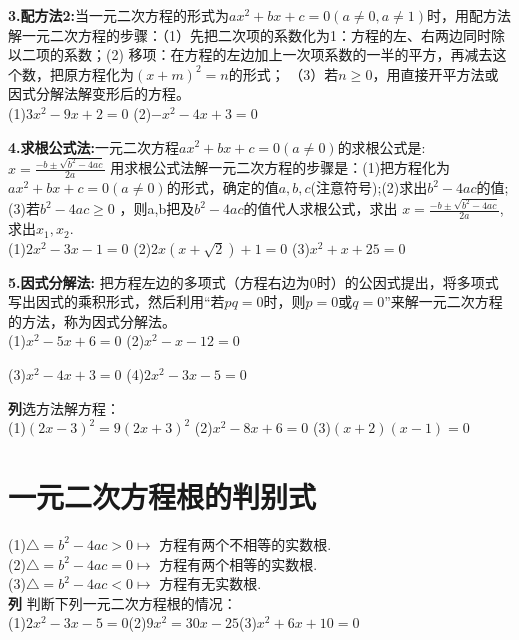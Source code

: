 \textbf{3.配方法2:}当一元二次方程的形式为$ax^2+bx+c=0(a\neq 0,a\neq 1 )$时，用配方法解一元二次方程的步骤：（1）先把二次项的系数化为1：方程的左、右两边同时除以二项的系数；(2) 移项：在方程的左边加上一次项系数的一半的平方，再减去这个数，把原方程化为$(x+m)^2=n $的形式；
（3）若$n\geq 0 $，用直接开平方法或因式分解法解变形后的方程。\\
(1)$3x^2-9x+2=0 $  \hspace{3cm}  (2)$-x^2-4x+3=0$\\
\vspace{2cm}

\textbf{4.求根公式法:}一元二次方程$ax^2+bx+c=0(a\neq 0 ) $的求根公式是:$x=\frac{-b\pm \sqrt{b^2-4ac} }{2a} $
用求根公式法解一元二次方程的步骤是：(1)把方程化为$ax^2+bx+c=0(a\neq 0) $的形式，确定的值$a,b,c $(注意符号);(2)求出$b^2-4ac $的值;(3)若$b^2-4ac\geq 0$ ，则a,b把及$b^2-4ac $的值代人求根公式，求出 $x=\frac{-b\pm \sqrt{b^2-4ac} }{2a} $,求出$x_1,x_2$.\\
(1)$2x^2-3x-1=0$ \hfill  (2)$2x(x+\sqrt{2})+1=0$ \hfill  (3)$x^2+x+25=0$\\
\vspace{3cm}

\textbf{5.因式分解法:} 把方程左边的多项式（方程右边为0时）的公因式提出，将多项式写出因式的乘积形式，然后利用“若$pq=0$时，则$p=0$或$q=0$”来解一元二次方程的方法，称为因式分解法。\\
(1)$x^2-5x+6=0$  \hfill  (2)$x^2-x-12=0$\par
\vspace{2cm}

(3)$x^2-4x+3=0$ \hfill (4)$2x^2-3x-5=0$\par
\vspace{2cm}

\textbf{列}选方法解方程：\\
(1)$(2x-3)^2=9(2x+3)^2$ \hfill (2)$x^2-8x+6=0$ \hfill  (3)$(x+2)(x-1)=0$
\vspace{2cm}

\section{一元二次方程根的判别式} 
(1)$\bigtriangleup =b^2-4ac >0 \longmapsto $ 方程有两个不相等的实数根.\\
(2)$\bigtriangleup =b^2-4ac =0 \longmapsto $
方程有两个相等的实数根.\\
(3)$\bigtriangleup =b^2-4ac <0 \longmapsto $
方程有无实数根.\\
\textbf{列} 判断下列一元二次方程根的情况：\\
(1)$2x^2-3x-5=0 $\hfill (2)$9x^2=30x-25 $\hfill (3)$x^2+6x+10=0$\\
\vspace{2cm}


